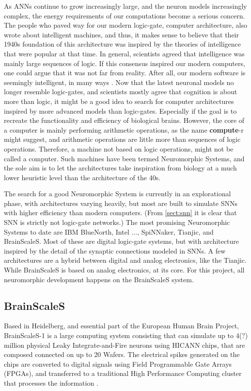 As ANNs continue to grow increasingly large, and the neuron models increasingly complex, the energy requirements of our computations become a serious concern.
The people who paved way for our modern logic-gate, computer architecture, also wrote about intelligent machines, and thus,
it makes sense to believe that their 1940s foundation of this architecture was inspired by the theories of intelligence that were popular at that time.
In general, scientists agreed that intelligence was mainly large sequences of logic. If this consensus inspired our modern computers,
one could argue that it was not far from reality. After all, our modern software is seemingly intelligent, in many ways \cite{history_of_ai}.
Now that the latest neuronal models no longer resemble logic-gates, and scientists mostly agree that cognition is about more than logic,
it might be a good idea to search for computer architectures inspired by more advanced models than logic-gates.
Especially if the goal is to recreate the functionality and efficiency of biological brains.
However, the core of a computer is mainly performing arithmetic operations, as the name \textbf{compute}-r might suggest,
and arithmetic operations are little more than sequences of logic operations. Therefore, a machine not based on logic operations,
might not be called a computer.
Such machines have been termed Neuromorphic Systems, and the sole aim is to let the architectures take inspiration from biology at a much lower heuristic level than the architecture of the 40s.

The search for a good Neuromorphic System is currently in an explorational phase, with architectures varying heavily, but most are built to simulate SNNs with higher efficiency than modern computers.
(From \vref{sect:snn} it is clear that SNN is strictly not logic-gate networks.)
The most promising Neuromorphic Systems to date are IBM BlueNorth, Intel ..., SpiNNaker, Tianjic, and BrainScaleS. \cite{furber_neuromorphic_survey} \cite{tianjic_hybrid}
Most of these are digital logic-gate systems, but with architecture inspired by the detail of the synaptic connections modeled in SNNs.
A few architectures are a hybrid between digital and analog electronics, like the Tianjic. While BrainScaleS is based on analog electronics, at its core.
For this project, all neuromorphic development happens on the BrainScaleS system.

\subsection{BrainScaleS}
Based in Heidelberg, and essential part of the European Human Brain Project,
BrainScaleS-1 is a large computing system consisting that can simulate
up to 4(?) million physical Leaky Integrate-and-Fire neurons using
HICANN chips, that are composed connected on up to 20 Wafers.
The electrical spikes generated on the chips are converted to digital
signals using Field Programmable Gate Arrays (FPGAs), and transferred to a traditional High Performance
Computing cluster that processes the information \cite{brainscales-1}
\cite{FPGA_survey}.

